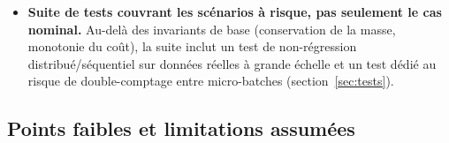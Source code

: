 \begin{itemize}
        (section~\ref{sec:experiments}), de reproduire et vérifier
        directement l'explication proposée par la thèse pour la légère
        amélioration de qualité observée à parallélisme croissant (plus de
        partitions égale plus de listes de buckets indépendantes).
  \item \textbf{Suite de tests couvrant les scénarios à risque, pas
        seulement le cas nominal.} Au-delà des invariants de base
        (conservation de la masse, monotonie du coût), la suite inclut un
        test de non-régression distribué/séquentiel sur données réelles à
        grande échelle et un test dédié au risque de double-comptage entre
        micro-batches (section~\ref{sec:tests}).
\end{itemize}

\subsection{Points faibles et limitations assumées}

